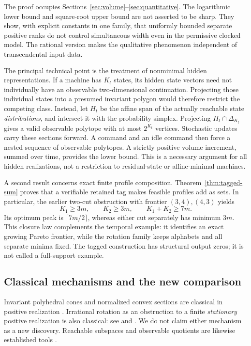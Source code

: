 The proof occupies Sections~\ref{sec:volume}--\ref{sec:quantitative}.
The logarithmic lower bound and square-root upper bound are not asserted
to be sharp. They show, with explicit constants in one family, that
uniformly bounded separate positive ranks do not control simultaneous
width even in the permissive clocked model. The rational version makes
the qualitative phenomenon independent of transcendental input data.

The principal technical point is the treatment of nonminimal hidden
representations. If a machine has $K_t$ states, its hidden state vectors
need not individually have an observable two-dimensional continuation.
Projecting those individual states into a presumed invariant polygon
would therefore restrict the competing class. Instead, let $H_t$ be the
affine span of the actually reachable state \emph{distributions}, and
intersect it with the probability simplex. Projecting
$H_t\cap\Delta_{K_t}$ gives a valid observable polytope with at most
$2^{K_t}$ vertices. Stochastic updates carry these sections forward.
A command and an idle command then force a nested sequence of observable
polytopes. A strictly positive volume increment, summed over time,
provides the lower bound. This is a necessary argument for all hidden
realizations, not a restriction to residual-state or affine-minimal
machines.

A second result concerns exact finite profile composition.
Theorem~\ref{thm:tagged-sum} proves that a verifiable retained tag makes
feasible profiles add as sets. In particular, the earlier two-cut
obstruction with frontier $(3,4),(4,3)$ yields
\[
       K_1\ge3m,\qquad K_2\ge3m,\qquad K_1+K_2\ge7m.
\]
Its optimum peak is $\lceil7m/2\rceil$, whereas either cut separately has
minimum $3m$. This closure law complements the temporal example: it
identifies an exact growing Pareto frontier, while the rotation family
keeps alphabets and all separate minima fixed. The tagged construction
has structural output zeros; it is not called a full-support example.

\subsection{Classical mechanisms and the new comparison}
Invariant polyhedral cones and normalized convex sections are classical
in positive realization \cite{Heller,BF,Vidyasagar}. Irrational rotation
as an obstruction to a finite \emph{stationary} positive realization is
also classical: see \cite[Example 4]{BF} and
\cite[Theorem 6, Example 2 and Lemma 7]{MW}. We do not claim either
mechanism as a new discovery. Reachable subspaces and observable
quotients are likewise established tools \cite[Section 4]{MW}.

